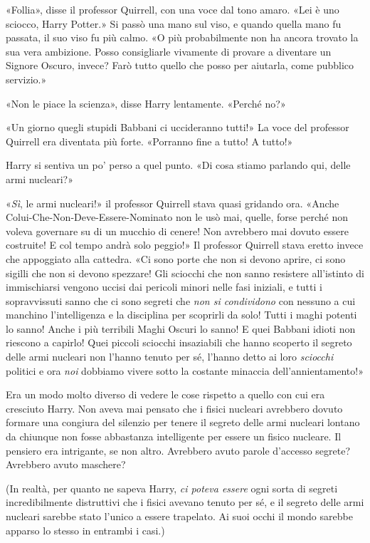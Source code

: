 «Follia», disse il professor Quirrell, con una voce dal tono amaro. «Lei è uno sciocco, Harry Potter.» Si passò una mano sul viso, e quando quella mano fu passata, il suo viso fu più calmo. «O più probabilmente non ha ancora trovato la sua vera ambizione. Posso consigliarle vivamente di provare a diventare un Signore Oscuro, invece? Farò tutto quello che posso per aiutarla, come pubblico servizio.»

«Non le piace la scienza», disse Harry lentamente. «Perché no?»

«Un giorno quegli stupidi Babbani ci uccideranno tutti!» La voce del professor Quirrell era diventata più forte. «Porranno fine a tutto! A tutto!»

Harry si sentiva un po’ perso a quel punto. «Di cosa stiamo parlando qui, delle armi nucleari?»

«\textit{Sì}, le armi nucleari!» il professor Quirrell stava quasi gridando ora. «Anche Colui-Che-Non-Deve-Essere-Nominato non le usò mai, quelle, forse perché non voleva governare su di un mucchio di cenere! Non avrebbero mai dovuto essere costruite! E col tempo andrà solo peggio!» Il professor Quirrell stava eretto invece che appoggiato alla cattedra. «Ci sono porte che non si devono aprire, ci sono sigilli che non si devono spezzare! Gli sciocchi che non sanno resistere all’istinto di immischiarsi vengono uccisi dai pericoli minori nelle fasi iniziali, e tutti i sopravvissuti sanno che ci sono segreti che \textit{non si condividono} con nessuno a cui manchino l’intelligenza e la disciplina per scoprirli da solo! Tutti i maghi potenti lo sanno! Anche i più terribili Maghi Oscuri lo sanno! E quei Babbani idioti non riescono a capirlo! Quei piccoli sciocchi insaziabili che hanno scoperto il segreto delle armi nucleari non l’hanno tenuto per sé, l’hanno detto ai loro \textit{sciocchi} politici e ora \textit{noi} dobbiamo vivere sotto la costante minaccia dell’annientamento!»

Era un modo molto diverso di vedere le cose rispetto a quello con cui era cresciuto Harry. Non aveva mai pensato che i fisici nucleari avrebbero dovuto formare una congiura del silenzio per tenere il segreto delle armi nucleari lontano da chiunque non fosse abbastanza intelligente per essere un fisico nucleare. Il pensiero era intrigante, se non altro. Avrebbero avuto parole d’accesso segrete? Avrebbero avuto maschere?

(In realtà, per quanto ne sapeva Harry, \textit{ci poteva essere} ogni sorta di segreti incredibilmente distruttivi che i fisici avevano tenuto per sé, e il segreto delle armi nucleari sarebbe stato l’unico a essere trapelato. Ai suoi occhi il mondo sarebbe apparso lo stesso in entrambi i casi.)

